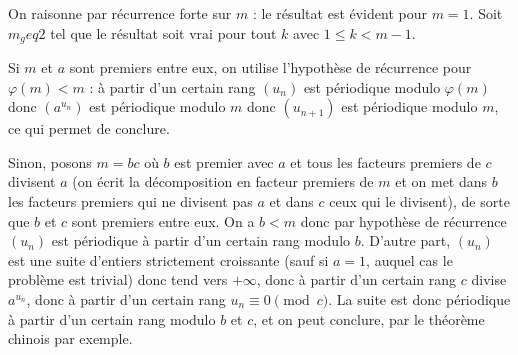 \begin{sol}
On raisonne par récurrence forte sur $m$ : le résultat est évident pour $m=1$. Soit $m _geq 2$ tel que le résultat soit vrai pour tout $k$ avec $1 \leq k < m-1$.

Si $m$ et $a$ sont premiers entre eux, on utilise l'hypothèse de récurrence pour $\varphi(m)<m$ : à partir d'un certain rang $(u_n)$ est périodique modulo $\varphi(m)$ donc $(a^{u_n})$ est périodique modulo $m$ donc $(u_{n+1})$ est périodique modulo $m$, ce qui permet de conclure.

Sinon, posons $m=bc$ où $b$ est premier avec $a$ et tous les facteurs premiers de $c$ divisent $a$ (on écrit la décomposition en facteur premiers de $m$ et on met dans $b$ les facteurs premiers qui ne divisent pas $a$ et dans $c$ ceux qui le divisent), de sorte que $b$ et $c$ sont premiers entre eux. On a $b<m$ donc par hypothèse de récurrence $(u_n)$ est périodique à partir d'un certain rang modulo $b$. D'autre part, $(u_n)$ est une suite d'entiers strictement croissante (sauf si $a=1$, auquel cas le problème est trivial) donc tend vers $+\infty$, donc à partir d'un certain rang $c$ divise $a^{u_n}$, donc à partir d'un certain rang $u_n \equiv 0 \pmod{c}$. La suite est donc périodique à partir d'un certain rang modulo $b$ et $c$, et on peut conclure, par le théorème chinois par exemple.
\end{sol}
